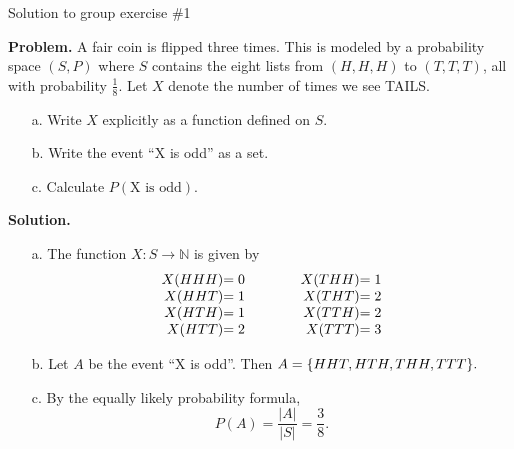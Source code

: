 \documentclass[10pt]{beamer}
\begin{document}
\begin{frame}{Solution to group exercise \#1}

\textbf{Problem.} A fair coin is flipped three times. This is modeled by a probability space $(S,P)$ where $S$ contains the eight lists from $(H,H,H)$ to $(T,T,T)$, all with probability $\frac{1}{8}$.  Let $X$ denote the number of times we see TAILS.
	\begin{itemize} \footnotesize 
	\item[a.] Write $X$ explicitly as a function defined on $S$.
	\item[b.] Write the event \enquote{X is odd} as a set.
	\item[c.] Calculate $P(\text{X is odd})$.
	\end{itemize}
\vfill 

\textbf{Solution.} 
	\begin{itemize} \small
	\item[a.]  The function $X: S \to \mathbb{N}$ is given by
	\[\begin{array}{r@{}lcr@{}l}
	X(HHH) &= 0 &\qquad & X(THH) &=1 \\
	X(HHT) &= 1 &\qquad & X(THT) &=2 \\
	X(HTH) &= 1 &\qquad & X(TTH) &=2 \\
	X(HTT) &= 2 &\qquad & X(TTT) &=3 \\
	\end{array}\]
	\item[b.] Let $A$ be the event \enquote{X is odd}.  Then $A=\{ {HHT, HTH, THH, TTT} \}.$
	\item[c.] By the equally likely probability formula,
	\[ P(A) = \frac{|A|}{|S|}  = \frac{3}{8}. \]
	\end{itemize}
\vfill 
\end{frame}
\end{document}
